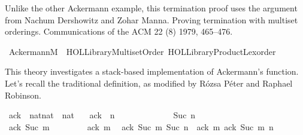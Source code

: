 %
\begin{isabellebody}%
%
%
\isadelimdocument
%
\endisadelimdocument
%
\isatagdocument
%
\isamarkuptrue%
%
\endisatagdocument
{\isafolddocument}%
%
\isadelimdocument
%
\endisadelimdocument
%
\begin{isamarkuptext}%
Unlike the other Ackermann example, this termination proof uses the argument from
Nachum Dershowitz and Zohar Manna. Proving termination with multiset orderings.
Communications of the ACM 22 (8) 1979, 465–476.%
\end{isamarkuptext}\isamarkuptrue%
%
\isadelimtheory
%
\endisadelimtheory
%
\isatagtheory
{}\isamarkupfalse%
\ AckermannM\ \ {\isachardoublequoteopen}HOL{\isacharminus}{\kern0pt}Library{\isachardot}{\kern0pt}Multiset{\isacharunderscore}{\kern0pt}Order{\isachardoublequoteclose}\ {\isachardoublequoteopen}HOL{\isacharminus}{\kern0pt}Library{\isachardot}{\kern0pt}Product{\isacharunderscore}{\kern0pt}Lexorder{\isachardoublequoteclose}\isanewline
\isanewline
{}%
\endisatagtheory
{\isafoldtheory}%
%
\isadelimtheory
%
\endisadelimtheory
%
\begin{isamarkuptext}%
This theory investigates a stack-based implementation of Ackermann's function.
Let's recall the traditional definition,
as modified by R{\'o}zsa P\'eter and Raphael Robinson.%
\end{isamarkuptext}\isamarkuptrue%
\isamarkupfalse%
\ ack\ {\isacharcolon}{\kern0pt}{\isacharcolon}{\kern0pt}\ {\isachardoublequoteopen}{\isacharbrackleft}{\kern0pt}nat{\isacharcomma}{\kern0pt}nat{\isacharbrackright}{\kern0pt}\ {\isasymRightarrow}\ nat{\isachardoublequoteclose}\ \isanewline
\ \ {\isachardoublequoteopen}ack\ {}\ n\ \ \ \ \ \ \ \ \ \ \ \ \ {\isacharequal}{\kern0pt}\ Suc\ n{\isachardoublequoteclose}\isanewline
{\isacharbar}{\kern0pt}\ {\isachardoublequoteopen}ack\ {\isacharparenleft}{\kern0pt}Suc\ m{\isacharparenright}{\kern0pt}\ {}\ \ \ \ \ \ \ {\isacharequal}{\kern0pt}\ ack\ m\ {}{\isachardoublequoteclose}\isanewline
{\isacharbar}{\kern0pt}\ {\isachardoublequoteopen}ack\ {\isacharparenleft}{\kern0pt}Suc\ m{\isacharparenright}{\kern0pt}\ {\isacharparenleft}{\kern0pt}Suc\ n{\isacharparenright}{\kern0pt}\ {\isacharequal}{\kern0pt}\ ack\ m\ {\isacharparenleft}{\kern0pt}ack\ {\isacharparenleft}{\kern0pt}Suc\ m{\isacharparenright}{\kern0pt}\ n{\isacharparenright}{\kern0pt}{\isachardoublequoteclose}%

\end{isabellebody}
